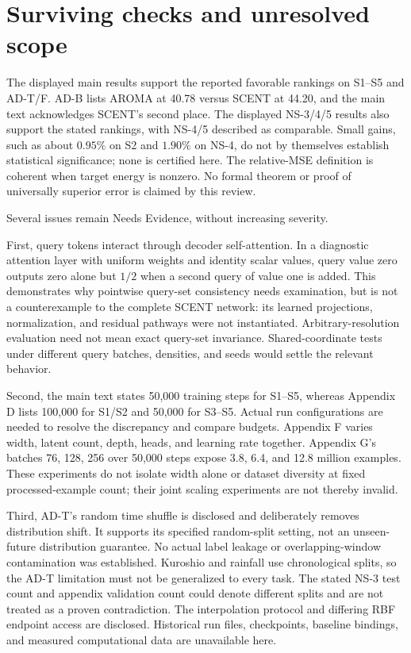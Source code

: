 \documentclass[10pt]{article}
\begin{document}
\section*{Surviving checks and unresolved scope}
The displayed main results support the reported favorable rankings on S1–S5 and AD-T/F. AD-B lists AROMA at 40.78 versus SCENT at 44.20, and the main text acknowledges SCENT’s second place. The displayed NS-3/4/5 results also support the stated rankings, with NS-4/5 described as comparable. Small gains, such as about \(0.95\%\) on S2 and \(1.90\%\) on NS-4, do not by themselves establish statistical significance; none is certified here. The relative-MSE definition is coherent when target energy is nonzero. No formal theorem or proof of universally superior error is claimed by this review.\par
Several issues remain Needs Evidence, without increasing severity.\par
First, query tokens interact through decoder self-attention. In a diagnostic attention layer with uniform weights and identity scalar values, query value zero outputs zero alone but \(1/2\) when a second query of value one is added. This demonstrates why pointwise query-set consistency needs examination, but is not a counterexample to the complete SCENT network: its learned projections, normalization, and residual pathways were not instantiated. Arbitrary-resolution evaluation need not mean exact query-set invariance. Shared-coordinate tests under different query batches, densities, and seeds would settle the relevant behavior.\par
Second, the main text states 50,000 training steps for S1–S5, whereas Appendix D lists 100,000 for S1/S2 and 50,000 for S3–S5. Actual run configurations are needed to resolve the discrepancy and compare budgets. Appendix F varies width, latent count, depth, heads, and learning rate together. Appendix G’s batches 76, 128, 256 over 50,000 steps expose 3.8, 6.4, and 12.8 million examples. These experiments do not isolate width alone or dataset diversity at fixed processed-example count; their joint scaling experiments are not thereby invalid.\par
Third, AD-T’s random time shuffle is disclosed and deliberately removes distribution shift. It supports its specified random-split setting, not an unseen-future distribution guarantee. No actual label leakage or overlapping-window contamination was established. Kuroshio and rainfall use chronological splits, so the AD-T limitation must not be generalized to every task. The stated NS-3 test count and appendix validation count could denote different splits and are not treated as a proven contradiction. The interpolation protocol and differing RBF endpoint access are disclosed. Historical run files, checkpoints, baseline bindings, and measured computational data are unavailable here.\par
\end{document}
